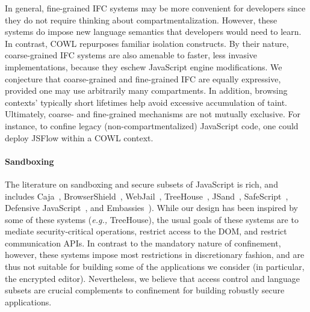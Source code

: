 In general, fine-grained IFC systems may be more convenient for
developers since they do not require thinking about
compartmentalization.
%
However, these systems do impose new language semantics that
developers would need to learn. In contrast, COWL repurposes familiar
isolation constructs.
%
By their nature, coarse-grained IFC systems are also amenable to
faster, less invasive implementations, because they eschew JavaScript
engine modifications.
%
We conjecture that coarse-grained and fine-grained IFC are
equally expressive, provided one may use arbitrarily many
compartments. In addition, browsing contexts' typically short
lifetimes help avoid excessive accumulation of taint.
%
Ultimately, coarse- and fine-grained mechanisms are not mutually
exclusive. For instance, to confine legacy (non-compartmentalized)
JavaScript code, one could deploy JSFlow within a COWL context.

\paragraph{Sandboxing}
The literature on sandboxing and secure subsets of JavaScript is rich,
and includes Caja~\cite{GoogleCaja}, BrowserShield~\cite{Reis:2007},
WebJail~\cite{VanAcker:2011}, TreeHouse~\cite{Ingram:2012},
JSand~\cite{Agten:2012:JCC}, SafeScript~\cite{SafeScript}, Defensive
JavaScript~\cite{djs}, and Embassies~\cite{Howell:2013}).
%
While our design has been inspired by some of these systems (\emph{e.g.,}
TreeHouse), the usual goals of these systems are to mediate
security-critical operations, restrict access to the DOM, and restrict
communication APIs\@.
%
In contrast to the mandatory nature of confinement, however, these
systems impose most restrictions in discretionary fashion, and are
thus not suitable for building some of the applications we consider
(in particular, the encrypted editor).
%
Nevertheless, we believe that access control and language subsets are
crucial complements to confinement for building robustly secure
applications.


